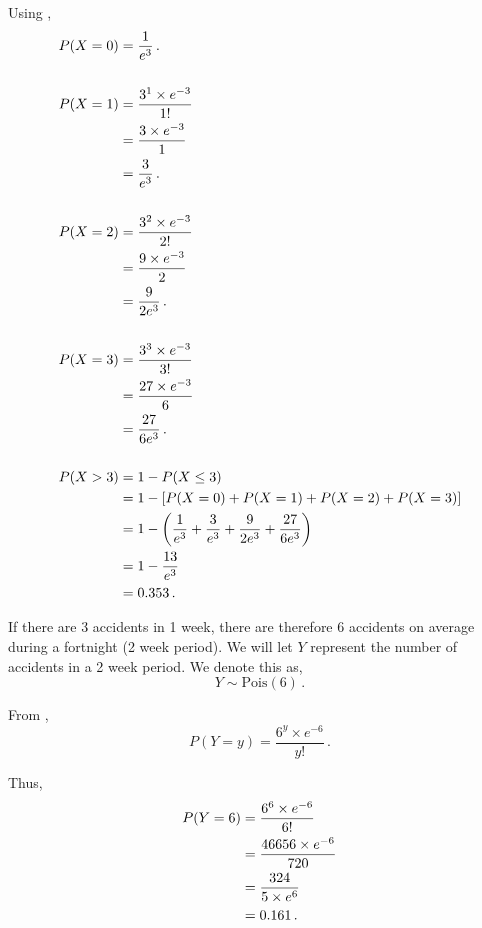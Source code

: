 \begin{subquestions}
\begin{subsubquestions}
Using , 
\begin{align}
	P(X=0) & = \frac{1}{e^3} \,. \\ \nonumber \\
	P(X=1) & = \frac{ 3^1 \times e^{-3}}{1!} \nonumber \\
	       & = \frac{3 \times e^{-3}}{1} \nonumber \\
	       & = \frac{3}{e^3} \,. \\ \nonumber \\
	P(X=2) & = \frac{ 3^2 \times e^{-3}}{2!} \nonumber \\
	       & = \frac{9 \times e^{-3}}{2} \nonumber \\
	       & = \frac{9}{2e^3} \,. \\ \nonumber \\
	P(X=3) & = \frac{ 3^3 \times e^{-3}}{3!} \nonumber \\
	       & = \frac{27 \times e^{-3}}{6} \nonumber \\
	       & = \frac{27}{6e^3} \,. \\ \nonumber \\
	P(X>3) & =1-P(X \leq 3) \nonumber \\
		   & = 1 - [P(X=0)+P(X=1)+P(X=2)+P(X=3)] \nonumber \\
		   & = 1 - \left(\frac{1}{e^3} + \frac{3}{e^3} + \frac{9}{2e^3} + \frac{27}{6e^3} \right) \nonumber \\
		   & = 1 - \frac{13}{e^3} \nonumber \\
		   & = 0.353 \,.
\end{align}


\subsubquestion

If there are 3 accidents in 1 week, there are therefore 6 accidents on average during a fortnight (2 week period). We will let $Y$ represent the number of accidents in a 2 week period. We denote this as,
\begin{equation}
	Y \sim \text{Pois}(6) \,.
\end{equation} 

From ,
\begin{equation}
	P(Y = y) =\frac{ 6 ^ y \times e^{-6}}{y!} \,.
\end{equation}

Thus,
\begin{align}
	P(Y = 6) & = \frac{ 6 ^ 6 \times e^{-6}}{6!} \nonumber \\	
	         & = \frac{46656 \times e^{-6}}{720} \nonumber \\
	         & = \frac{324}{5 \times e^6} \nonumber \\
	         & = 0.161 \,.
\end{align}


\end{subsubquestions}
\end{subquestions}
